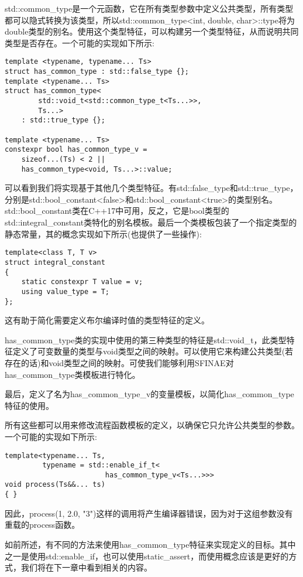 std::common\_type是一个元函数，它在所有类型参数中定义公共类型，所有类型都可以隐式转换为该类型，所以std::common\_type<int, double, char>::type将为double类型的别名。使用这个类型特征，可以构建另一个类型特征，从而说明共同类型是否存在。一个可能的实现如下所示:

\begin{lstlisting}[style=styleCXX]
template <typename, typename... Ts>
struct has_common_type : std::false_type {};
template <typename... Ts>
struct has_common_type<
		std::void_t<std::common_type_t<Ts...>>,
		Ts...>
	: std::true_type {};
	
template <typename... Ts>
constexpr bool has_common_type_v =
	sizeof...(Ts) < 2 ||
	has_common_type<void, Ts...>::value;
\end{lstlisting}

可以看到我们将实现基于其他几个类型特征。有std::false\_type和std::true\_type，分别是std::bool\_constant<false>和std::bool\_constant<true>的类型别名。std::bool\_constant类在C++17中可用，反之，它是bool类型的std::integral\_constant类特化的别名模板。最后一个类模板包装了一个指定类型的静态常量，其的概念实现如下所示(也提供了一些操作):

\begin{lstlisting}[style=styleCXX]
template<class T, T v>
struct integral_constant
{
	static constexpr T value = v;
	using value_type = T;
};
\end{lstlisting}

这有助于简化需要定义布尔编译时值的类型特征的定义。

has\_common\_type类的实现中使用的第三种类型的特征是std::void\_t，此类型特征定义了可变数量的类型与void类型之间的映射。可以使用它来构建公共类型(若存在的话)和void类型之间的映射。可使我们能够利用SFINAE对has\_common\_type类模板进行特化。

最后，定义了名为has\_common\_type\_v的变量模板，以简化has\_common\_type特征的使用。

所有这些都可以用来修改流程函数模板的定义，以确保它只允许公共类型的参数。一个可能的实现如下所示:

\begin{lstlisting}[style=styleCXX]
template<typename... Ts,
		 typename = std::enable_if_t<
						has_common_type_v<Ts...>>>
void process(Ts&&... ts)
{ }
\end{lstlisting}

因此，process(1, 2.0, "3")这样的调用将产生编译器错误，因为对于这组参数没有重载的process函数。

如前所述，有不同的方法来使用has\_common\_type特征来实现定义的目标。其中之一是使用std::enable\_if，也可以使用static\_assert，而使用概念应该是更好的方式，我们将在下一章中看到相关的内容。









